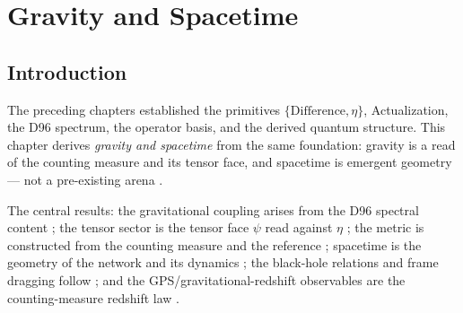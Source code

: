 %
%


\chapter{Gravity and Spacetime}
\label{c10:chap:gravity}

\section{Introduction}
\label{c10:sec:gravity-introduction}

The preceding chapters established the primitives $\{\text{Difference},\eta\}$,
Actualization, the D96 spectrum, the operator basis, and the derived quantum structure.
This chapter derives
\emph{gravity and spacetime} from the same foundation: gravity is a read of the counting
measure and its tensor face, and spacetime is emergent geometry --- not a pre-existing
arena \cite{c10:QG181,c10:QG184,c10:QG222}.

The central results: the gravitational coupling arises from the D96 spectral content
\cite{c10:QG181,c10:QG182,c10:QG183}; the tensor sector is the tensor face $\psi$ read against
$\eta$ \cite{c10:QG285,c10:QG286}; the metric is constructed
from the counting measure and the reference \cite{c10:QG292}; spacetime is the geometry of the
network and its dynamics \cite{c10:QG222}; the black-hole relations and frame dragging
follow \cite{c10:QG184,c10:QG186}; and the GPS/gravitational-redshift observables are the
counting-measure redshift law \cite{c10:QG187}.

